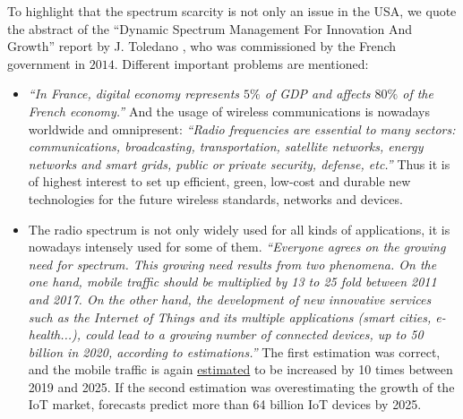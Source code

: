 To highlight that the spectrum scarcity is not only an issue in the USA,
we quote the abstract of the ``Dynamic Spectrum Management For Innovation And Growth'' report by J. Toledano \cite{Toledano2014EnglishSummary,Toledano2014FrenchFull}, who was commissioned by the French government in $2014$.
Different important problems are mentioned:
%
\begin{itemize}%
    \item
    \emph{``In France, digital economy represents $5\%$ of GDP and affects $80\%$ of the French economy.''}
    And the usage of wireless communications is nowadays worldwide and omnipresent:
    \emph{``Radio frequencies are essential to many sectors: communications, broadcasting, transportation, satellite networks, energy networks and smart grids, public or private security, defense, etc.''}
    Thus it is of highest interest to set up efficient, green, low-cost and durable new technologies for the future wireless standards, networks and devices.
    \item
    The radio spectrum is not only widely used for all kinds of applications, it is nowadays intensely used for some of them.
    \emph{``Everyone agrees on the growing need for spectrum.
    This growing need results from two phenomena.
    On the one hand, mobile traffic should be multiplied by 13 to 25 fold between 2011 and 2017.
    On the other hand, the development of new innovative services such as the Internet of Things and its multiple applications (smart cities, e-health...), could lead to a growing number of connected devices, up to 50 billion in 2020, according to estimations.''}
    The first estimation was correct, and the mobile traffic is again \href{https://www.ericsson.com/en/mobility-report/future-mobile-data-usage-and-traffic-growth}{estimated} to be increased by 10 times between 2019 and 2025.
    If the second estimation was overestimating the growth of the IoT market, forecasts predict  more than 64 billion IoT devices by 2025.

\end{itemize}
